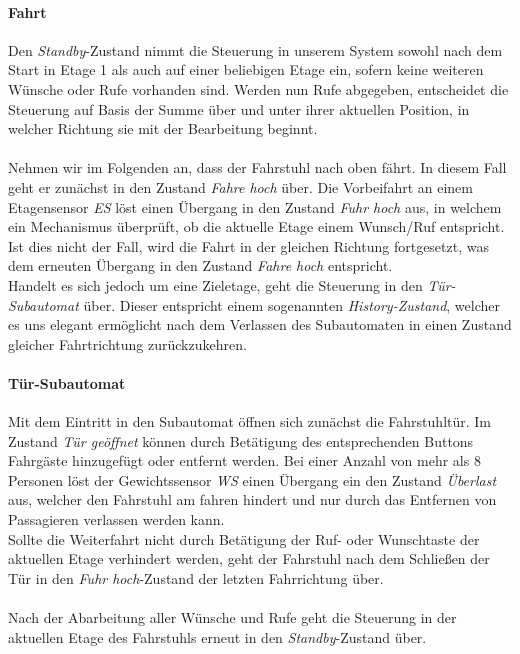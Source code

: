 \paragraph{Fahrt}
Den \textit{Standby}-Zustand nimmt die Steuerung in unserem System sowohl nach dem Start in Etage 1 als auch auf einer beliebigen Etage ein, sofern keine weiteren Wünsche oder Rufe vorhanden sind. Werden nun Rufe abgegeben, entscheidet die Steuerung auf Basis der Summe über und unter ihrer aktuellen Position, in welcher Richtung sie mit der Bearbeitung beginnt.

\paragraph{}Nehmen wir im Folgenden an, dass der Fahrstuhl nach oben fährt. In diesem Fall geht er zunächst in den Zustand \textit{Fahre hoch} über. Die Vorbeifahrt an einem Etagensensor \textit{ES} löst einen Übergang in den Zustand \textit{Fuhr hoch} aus, in welchem ein Mechanismus überprüft, ob die aktuelle Etage einem Wunsch/Ruf entspricht. Ist dies nicht der Fall, wird die Fahrt in der gleichen Richtung fortgesetzt, was dem erneuten Übergang in den Zustand \textit{Fahre hoch} entspricht.\\
Handelt es sich jedoch um eine Zieletage, geht die Steuerung in den \textit{Tür-Subautomat} über. Dieser entspricht einem sogenannten \textit{History-Zustand}\cite{history_Z}, welcher es uns elegant ermöglicht nach dem Verlassen des Subautomaten in einen Zustand gleicher Fahrtrichtung zurückzukehren.

\paragraph{Tür-Subautomat}
Mit dem Eintritt in den Subautomat öffnen sich zunächst die Fahrstuhltür. Im Zustand \textit{Tür geöffnet} können durch Betätigung des entsprechenden Buttons Fahrgäste hinzugefügt oder entfernt werden. Bei einer Anzahl von mehr als 8 Personen löst der Gewichtssensor \textit{WS} einen Übergang ein den Zustand \textit{Überlast} aus, welcher den Fahrstuhl am fahren hindert und nur durch das Entfernen von Passagieren verlassen werden kann.\\
Sollte die Weiterfahrt nicht durch Betätigung der Ruf- oder Wunschtaste der aktuellen Etage verhindert werden, geht der Fahrstuhl nach dem Schließen der Tür in den \textit{Fuhr hoch}-Zustand der letzten Fahrrichtung über.

\paragraph{}Nach der Abarbeitung aller Wünsche und Rufe geht die Steuerung in der aktuellen Etage des Fahrstuhls erneut in den \textit{Standby}-Zustand über.

